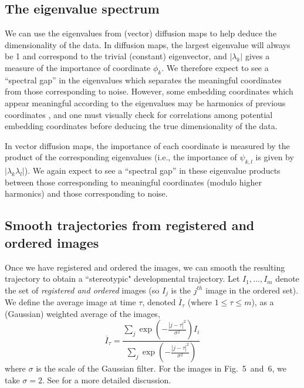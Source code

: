 \documentclass[10pt,twocolumn]{article}
\newcommand{\fig}[0]{Fig.}
\begin{document}
\subsection*{The eigenvalue spectrum}

We can use the eigenvalues from (vector) diffusion maps to help deduce the dimensionality of the data.
%
In diffusion maps, the largest eigenvalue will always be 1 and correspond to the trivial (constant) eigenvector, and $|\lambda_k|$ gives a measure of the importance of coordinate $\phi_k$. 
%
We therefore expect to see a ``spectral gap'' in the eigenvalues which separates the meaningful coordinates from those corresponding to noise.
%
However, some embedding coordinates which appear meaningful according to the eigenvalues may be harmonics of previous coordinates \citep{ferguson2010systematic}, 
and one must visually check for correlations among potential embedding coordinates before deducing the true dimensionality of the data. 

In vector diffusion maps, the importance of each coordinate is measured by the product of the corresponding eigenvalues (i.e., the importance of $\psi_{k,l}$ is given by $| \lambda_k \lambda_l |$). 
%
We again expect to see a ``spectral gap'' in these eigenvalue products between those corresponding to meaningful coordinates (modulo higher harmonics) and those corresponding to noise. 


\subsection*{Smooth trajectories from registered and ordered images}

Once we have registered and ordered the images, we can smooth the resulting trajectory to obtain a ``stereotypic" developmental trajectory.
%
Let $I_1, \dots, I_m$ denote the set of {\em registered and ordered} images (so $I_j$ is the $j^{th}$ image in the ordered set).
%
We define the average image at time $\tau$, denoted $\overline{I}_{\tau}$ (where $1 \le \tau \le m$), as a (Gaussian) weighted average of the images,
\begin{equation}
\overline{I}_{\tau} =  \frac{\sum_j \exp \left( - \frac{|j - \tau|^2}{\sigma^2} \right) I_i}{\sum_j \exp \left( - \frac{|j - \tau|^2}{\sigma^2} \right) }
\end{equation}
where $\sigma$ is the scale of the Gaussian filter.
%
For the images in \fig~5~and~6, we take $\sigma = 2$.
%
See \citep{kemelmacher2011exploring} for a more detailed discussion.
\end{document}

